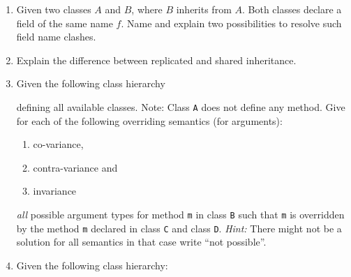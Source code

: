 \documentclass{article}
\newcommand{\comment}[1]{\marginpar{#1}}
\begin{document}
\begin{enumerate}
\item Given two classes $A$ and $B$, where $B$ inherits from $A$. Both
  classes declare a field of the same name $f$.  Name and explain two
  possibilities to resolve such field name clashes.
\item Explain the difference between replicated and shared
  inheritance. 
\item Given the following class
  hierarchy \\
\begin{center}

\end{center}
defining all available classes. Note: Class \lstinline!A! does not
define any method.
Give for each of the following overriding semantics (for arguments):
\begin{enumerate}
  \item co-variance,
  \item contra-variance and
  \item invariance
\end{enumerate}
\emph{all} possible argument types for method
\lstinline!m! in class \lstinline!B! such that
\lstinline!m! is overridden by the method \lstinline!m! declared in
class \lstinline!C! and class \lstinline!D!. \emph{Hint:} There might
not be a solution for all semantics in that case write ``not possible''.  \comment{\textbf{3 points}}\newpage
\item Given the following class hierarchy:\\
\end{enumerate}
\end{document}
